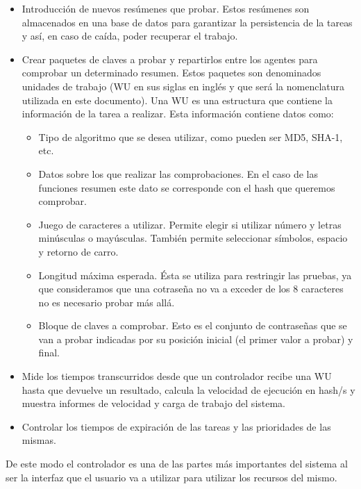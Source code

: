\begin{itemize}
	\item Introducción de nuevos resúmenes que probar. Estos resúmenes son almacenados en una base de datos para garantizar la persistencia de la tareas y así, en caso de caída, poder recuperar el trabajo.

	\item Crear paquetes de claves a probar y repartirlos entre los agentes para comprobar un determinado resumen. Estos paquetes son denominados unidades de trabajo (WU en sus siglas en inglés y que será la nomenclatura utilizada en este documento). Una WU es una estructura que contiene la información de la tarea a realizar. Esta información contiene datos como:

	\begin{itemize}
		\item Tipo de algoritmo que se desea utilizar, como pueden ser MD5, SHA-1, etc.
	
		\item Datos sobre los que realizar las comprobaciones. En el caso de las funciones resumen este dato se corresponde con el hash que queremos comprobar.
	
		\item Juego de caracteres a utilizar. Permite elegir si utilizar número y letras minúsculas o mayúsculas. También permite seleccionar símbolos, espacio y retorno de carro.
	
		\item Longitud máxima esperada. Ésta se utiliza para restringir las pruebas, ya que consideramos que una cotraseña no va a exceder de los 8 caracteres no es necesario probar más allá.
	
		\item Bloque de claves a comprobar. Esto es el conjunto de contraseñas que se van a probar indicadas por su posición inicial (el primer valor a probar) y final.
	\end{itemize}
	
	\item Mide los tiempos transcurridos desde que un controlador recibe una WU hasta que devuelve un resultado, calcula la velocidad de ejecución en hash/s y muestra informes de velocidad y carga de trabajo del sistema.
	
	\item Controlar los tiempos de expiración de las tareas y las prioridades de las mismas.
\end{itemize}

De este modo el controlador es una de las partes más importantes del sistema al ser la interfaz que el usuario va a utilizar para utilizar los recursos del mismo.

